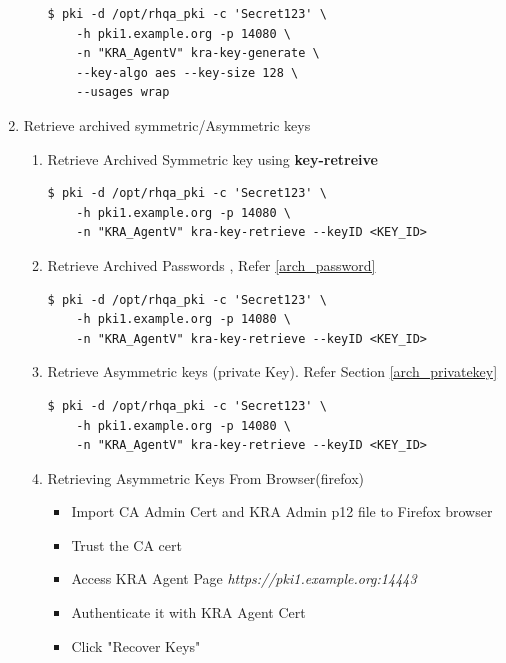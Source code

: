 \documentclass[a4paper]{article}
\begin{document}
\begin{enumerate}[label*=\arabic*.]
\begin{enumerate}[label*=\arabic*.]
                    \begin{lstlisting}[style=bashInputStyle]
$ pki -d /opt/rhqa_pki -c 'Secret123' \
    -h pki1.example.org -p 14080 \
    -n "KRA_AgentV" kra-key-generate \
    --key-algo aes --key-size 128 \
    --usages wrap 
                    \end{lstlisting}
            \end{enumerate}
        \item  Retrieve archived symmetric/Asymmetric keys 
            \begin{enumerate}[label*=\arabic*.]
                \item Retrieve Archived Symmetric key using \textbf{key-retreive}
                    \begin{lstlisting}[style=bashInputStyle]
$ pki -d /opt/rhqa_pki -c 'Secret123' \
    -h pki1.example.org -p 14080 \
    -n "KRA_AgentV" kra-key-retrieve --keyID <KEY_ID>
                    \end{lstlisting}
                \item Retrieve Archived Passwords , Refer \ref{arch_password}
                    \begin{lstlisting}[style=bashInputStyle]
$ pki -d /opt/rhqa_pki -c 'Secret123' \
    -h pki1.example.org -p 14080 \
    -n "KRA_AgentV" kra-key-retrieve --keyID <KEY_ID>
                    \end{lstlisting}
                \item Retrieve Asymmetric keys (private Key). Refer Section \ref{arch_privatekey}
                    \begin{lstlisting}[style=bashInputStyle]
$ pki -d /opt/rhqa_pki -c 'Secret123' \
    -h pki1.example.org -p 14080 \
    -n "KRA_AgentV" kra-key-retrieve --keyID <KEY_ID>
                    \end{lstlisting}
                \item Retrieving Asymmetric Keys From Browser(firefox)
                    \begin{itemize}
                        \item Import CA Admin Cert and KRA Admin p12 file to Firefox browser
                        \item Trust the CA cert 
                        \item Access KRA Agent Page \textit{https://pki1.example.org:14443}
                        \item Authenticate it with KRA Agent Cert
                        \item Click "Recover Keys" 

\end{itemize}
\end{enumerate}
\end{enumerate}
\end{document}

